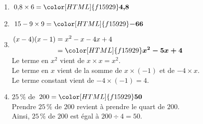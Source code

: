 \documentclass[a4paper,11pt,landscape,exos]{nsi} %
\begin{document}
\begin{multicols}{2}
\maketitle

\begin{enumerate}[]
    \item $0{,}8 \times 6={\color[HTML]{f15929}\boldsymbol{4{,}8}}$
\item $15-9\times9={\color[HTML]{f15929}\boldsymbol{-66}}$
\item $\begin{aligned}
      (x-4)(x-1)&=x^2-x-4x+4\\
      &={\color[HTML]{f15929}\boldsymbol{x^2-5x+4}}
      \end{aligned}$\\Le terme en $x^2$ vient de $x\times x=x^2$.\\Le terme en $x$ vient de la somme de $x \times (-1)$ et de $-4 \times x$.\\Le terme constant vient de $-4\times (-1)= 4$.
\item $25\,\%$ de $200 = {\color[HTML]{f15929}\boldsymbol{50}}$\\ Prendre $25\,\%$  de $200$ revient à prendre le quart de $200$.\\
      Ainsi, $25\,\%$ de $200$ est égal à $200\div 4 =50$.
     

\end{enumerate}
\end{multicols}
\end{document}
